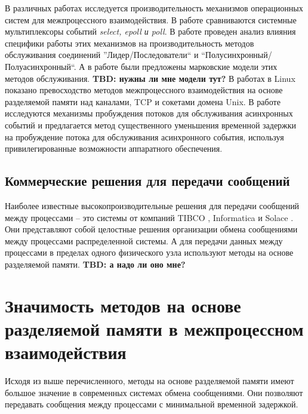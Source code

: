 В различных работах исследуется производительность механизмов операционных систем для межпроцессного взаимодействия. В работе \cite{MuxComparison} сравниваются системные мультиплексоры событий \textit{select, epoll и poll}. В работе \cite{AnalysisOfEventProcDesignPatterns} проведен анализ влияния специфики работы этих механизмов на производительность методов обслуживания соединений ''Лидер/Последователи`` и ``Полусинхронный/Полуасинхронный``. А в работе \cite{6298185} были предложены марковские модели этих методов обслуживания.
\textbf{TBD: нужны ли мне модели тут?}
В работах \cite{Smith2012DraftH, venkataraman2015evaluation} в Linux показано превосходство методов межпроцессного взаимодействия на основе разделяемой памяти над каналами, TCP и сокетами домена Unix.
В работе \cite{8526899} исследуются механизмы пробуждения потоков для обслуживания асинхронных событий и предлагается метод существенного уменьшения временной задержки на пробуждение потока для обслуживания асинхронного события, используя привилегированные возможности аппаратного обеспечения.

\subsection{Коммерческие решения для передачи сообщений}

Наиболее известные высокопроизводительные решения для передачи сообщений между процессами -- это системы от компаний TIBCO \cite{TIBCO}, Informatica \cite{Informatica} и Solace \cite{Solace}. Они представляют собой целостные решения организации обмена сообщениями между процессами распределенной системы. А для передачи данных между процессами в пределах одного физического узла используют методы на основе разделяемой памяти.
\textbf{TBD: а надо ли оно мне?}

\section{Значимость методов на основе разделяемой памяти в межпроцессном взаимодействия}

Исходя из выше перечисленного, методы на основе разделяемой памяти имеют большое значение в современных системах обмена сообщениями. Они позволяют передавать сообщения между процессами с минимальной временной задержкой.

